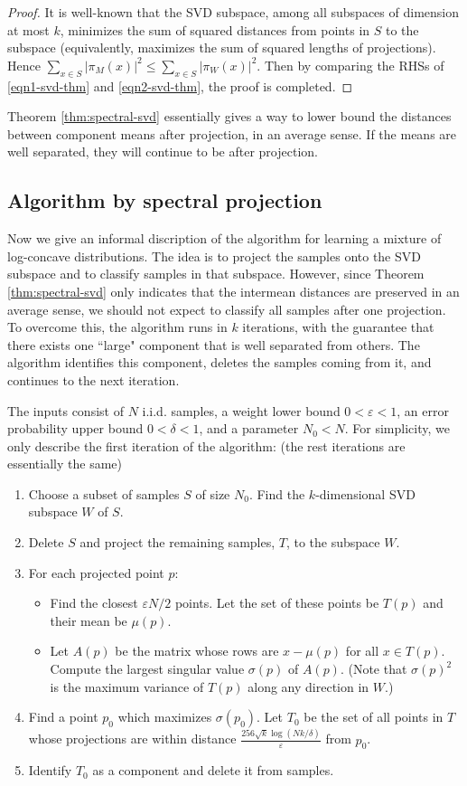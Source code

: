 \documentclass[11pt,letter]{article}
\begin{document}
\begin{proof}
It is well-known that the SVD subspace, among all subspaces of dimension at most $k$, minimizes the sum of squared distances from points in $S$ to the subspace (equivalently, maximizes the sum of squared lengths of projections). Hence $\sum_{x\in S}|\pi_M(x)|^2 \le \sum_{x\in S}|\pi_W(x)|^2$. Then by comparing the RHSs of \eqref{eqn1-svd-thm} and \eqref{eqn2-svd-thm}, the proof is completed.
\end{proof}

Theorem \ref{thm:spectral-svd} essentially gives a way to lower bound the distances between component means after projection, in an average sense. If the means are well separated, they will continue to be after projection.


\subsection{Algorithm by spectral projection}

Now we give an informal discription of the algorithm for learning a mixture of log-concave distributions.
The idea is to project the samples onto the SVD subspace and to classify samples in that subspace. However, since Theorem \ref{thm:spectral-svd} only indicates that the intermean distances are preserved in an average sense, we should not expect to classify all samples after one projection.
To overcome this, the algorithm runs in $k$ iterations, with the guarantee that there exists one ``large" component that is well separated from others. The algorithm identifies this component, deletes the samples coming from it, and continues to the next iteration.

The inputs consist of $N$ i.i.d. samples, a weight lower bound $0<\varepsilon<1$, an error probability upper bound $0<\delta<1$, and a parameter $N_0<N$. For simplicity, we only describe the first iteration of the algorithm: (the rest iterations are essentially the same)
\begin{enumerate}
\item Choose a subset of samples $S$ of size $N_0$. Find the $k$-dimensional SVD subspace $W$ of $S$.
\item Delete $S$ and project the remaining samples, $T$, to the subspace $W$.
\item For each projected point $p$:
\begin{itemize}
\item Find the closest $\varepsilon N/2$ points. Let the set of these points be $T(p)$ and their mean be $\mu(p)$.
\item Let $A(p)$ be the matrix whose rows are $x-\mu(p)$ for all $x\in T(p)$. Compute the largest singular value $\sigma(p)$ of $A(p)$. (Note that $\sigma(p)^2$ is the maximum variance of $T(p)$ along any direction in $W$.)
\end{itemize}
\item Find a point $p_0$ which maximizes $\sigma(p_0)$. Let $T_0$ be the set of all points in $T$ whose projections are within distance $\frac{256\sqrt k \log(Nk/\delta)}{\varepsilon}$ from $p_0$.
\item Identify $T_0$ as a component and delete it from samples.
\end{enumerate}
\end{document}
